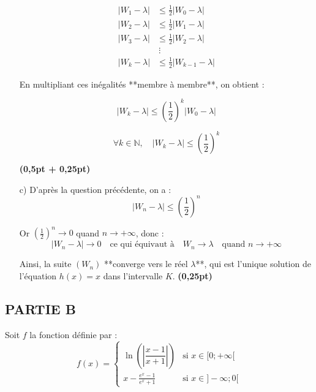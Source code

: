 \documentclass[12pt,a4paper]{article}
\begin{document}
\begin{enumerate}
        \begin{equation*}
            \begin{aligned}
                |W_{1} - \lambda| & \leq \frac{1}{2} |W_0 - \lambda|     \\
                |W_{2} - \lambda| & \leq \frac{1}{2} |W_1 - \lambda|     \\
                |W_{3} - \lambda| & \leq \frac{1}{2} |W_2 - \lambda|     \\
                                  & \ \vdots                             \\
                |W_k - \lambda|   & \leq \frac{1}{2} |W_{k-1} - \lambda|
            \end{aligned}
        \end{equation*}

        En multipliant ces inégalités **membre à membre**, on obtient :

        \begin{equation*}
            |W_k - \lambda| \leq \left( \frac{1}{2} \right)^k |W_0 - \lambda|
        \end{equation*}

        \[
            \forall k \in \mathbb{N},\quad |W_k - \lambda| \leq \left( \frac{1}{2} \right)^k
        \]

        \hfill \textbf{(0,5pt + 0,25pt)}
    \item[c)] D’après la question précédente, on a :
        \[
            |W_n - \lambda| \leq \left( \frac{1}{2} \right)^n
        \]

        Or \( \left( \frac{1}{2} \right)^n \to 0 \) quand \( n \to +\infty \), donc :
        \[
            |W_n - \lambda| \to 0
            \quad \text{ce qui équivaut à} \quad
            W_n \to \lambda
            \quad \text{quand } n \to +\infty
        \]

        Ainsi, la suite \( (W_n) \) **converge vers le réel \( \lambda \)**, qui est l’unique solution de l’équation \( h(x) = x \) dans l’intervalle \( K \). \hfill \textbf{(0,25pt)}

\end{enumerate}

\subsection*{PARTIE B}

Soit \( f \) la fonction définie par :
\[
    f(x) =
    \begin{cases}
        \ln\left( \left| \dfrac{x - 1}{x + 1} \right| \right) & \text{si } x \in [0 ; +\infty[ \\
        \displaystyle x-\frac{e^x - 1}{e^x + 1}               & \text{si } x \in ]-\infty ; 0[
    \end{cases}
\]
\end{document}
